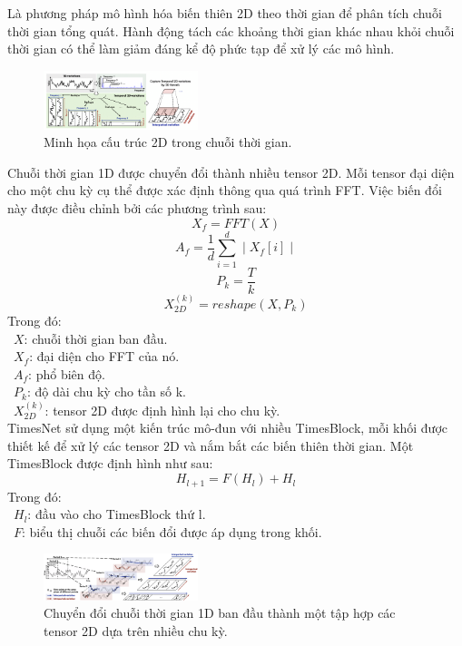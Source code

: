 Là phương pháp mô hình hóa biến thiên 2D theo thời gian để phân tích chuỗi thời gian tổng quát. Hành động tách các khoảng thời gian khác nhau khỏi chuỗi thời gian có thể làm giảm đáng kể độ phức tạp để xử lý các mô hình.

\begin{figure}[htbp]
\centerline{\includegraphics[width=0.4\textwidth]{img/2Dstructure.png}}
\caption{Minh họa cấu trúc 2D trong chuỗi thời gian.}
\label{fig}
\end{figure}

Chuỗi thời gian 1D được chuyển đổi thành nhiều tensor 2D. Mỗi tensor đại diện cho một chu kỳ cụ thể được xác định thông qua quá trình FFT. Việc biến đổi này được điều chỉnh bởi các phương trình sau:
\[
X_f=FFT(X)
\]
\[
A_f=\frac{1}{d}\sum\limits_{i=1}^d\mid X_f[i]\mid
\]
\[
P_k=\frac{T}{k}
\]
\[
X_{2D}^{(k)}= reshape(X, P_k)
\]
Trong đó:\\
    \indent\textbullet\ \(X\): chuỗi thời gian ban đầu.\\
    \indent\textbullet\ \(X_f\): đại diện cho FFT của nó.\\
    \indent\textbullet\ \(A_f\): phổ biên độ.\\
    \indent\textbullet\ \(P_k\): độ dài chu kỳ cho tần số k.\\
    \indent\textbullet\ \(X_{2D}^{(k)}\):  tensor 2D được định hình lại cho chu kỳ.\\

TimesNet sử dụng một kiến trúc mô-đun với nhiều TimesBlock, mỗi khối được thiết kế để xử lý các tensor 2D và nắm bắt các biến thiên thời gian. Một TimesBlock được định hình như sau:
\[
H_{l+1}=F(H_l)+H_l
\]
Trong đó:\\
    \indent\textbullet\ \(H_l\): đầu vào cho TimesBlock thứ l.\\
    \indent\textbullet\ \(F\): biểu thị chuỗi các biến đổi được áp dụng trong khối.
    
\begin{figure}[htbp]
\centerline{\includegraphics[width=0.4\textwidth]{img/2Dtensor.png}}
\caption{Chuyển đổi chuỗi thời gian 1D ban đầu thành một tập hợp các tensor 2D dựa trên nhiều chu kỳ.}
\label{fig}
\end{figure}